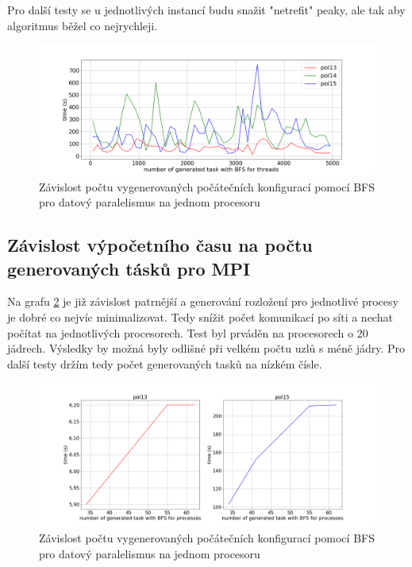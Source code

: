 \documentclass[]{article}
\begin{document}
Pro další testy se u jednotlivých instancí budu snažit "netrefit" peaky, ale tak aby algoritmus běžel co nejrychleji.


\begin{figure}[H]\centering
	\includegraphics[width=1\textwidth]{img/nN20T}
 	\caption{Závislost počtu vygenerovaných počátečních konfigurací pomocí BFS pro datový paralelismus na jednom procesoru}\label{a:nn20t}
 \end{figure}

\subsection{Závislost výpočetního času na počtu generovaných tásků pro MPI}
Na grafu \ref{a:nnP20t} je již závislost patrnější a generování rozložení pro jednotlivé procesy je dobré co nejvíc minimalizovat. Tedy snížit počet komunikací po síti a nechat počítat na jednotlivých procesorech. Test byl prváděn na procesorech o 20 jádrech. Výsledky by možná byly odlišné při velkém počtu uzlů s méně jádry. Pro další testy držím tedy počet generovaných tasků na nízkém čísle.

\begin{figure}[H]\centering
	\includegraphics[width=1\textwidth]{img/nNP60T}
 	\caption{Závislost počtu vygenerovaných počátečních konfigurací pomocí BFS pro datový paralelismus na jednom procesoru}\label{a:nnP20t}
 \end{figure}
\end{document}

